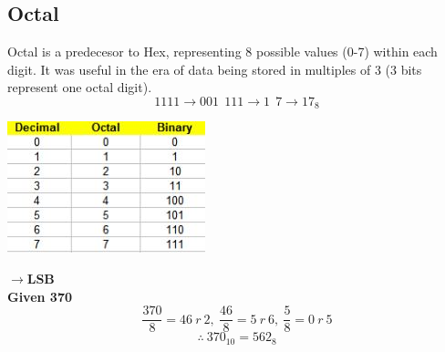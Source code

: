 \documentclass[a4paper,12pt]{article}
\begin{document}
        \subsection*{Octal}
        \begin{minipage}{9cm}
            Octal is a predecesor to Hex, representing 8 possible values (0-7) within each digit. It was useful in the era of data being stored in multiples of 3 (3 bits represent one octal digit).\[1111\rightarrow001~~111\rightarrow1~~7\rightarrow17_8\]  
        \end{minipage}
        \hspace{20pt}
        \begin{minipage}{9cm}
            \includegraphics{Octal table.JPG}
        \end{minipage}
        \vspace{20pt}$\rightarrow$\textbf{LSB}\\\textbf{Given 370} \[\frac{370}{8}=46~r~2,~\frac{46}{8}=5~r~6,~\frac{5}{8}=0~r~5\] \[\therefore~370_{10}=562_8\]
\end{document}
